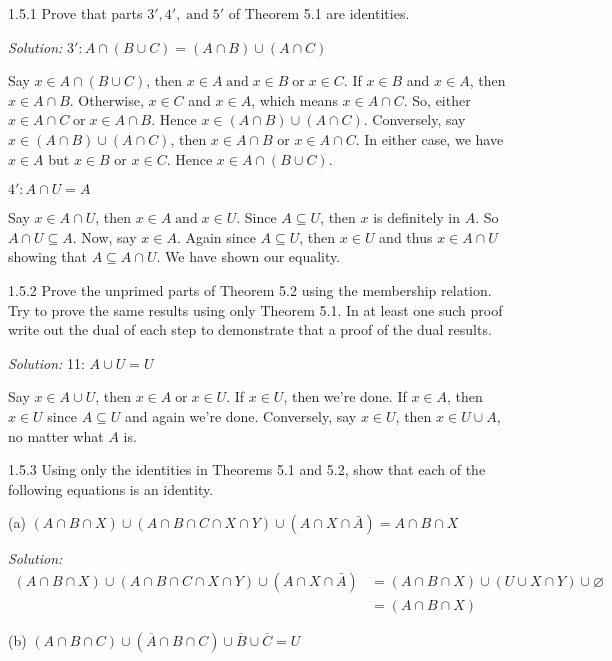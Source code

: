 \documentclass{letter}
\newcommand{\tmop}[1]{\ensuremath{\operatorname{#1}}}
\newcommand{\tmtextit}[1]{{\itshape{#1}}}
\begin{document}
1.5.1 Prove that parts $3', 4', \tmop{and} 5'$ of Theorem 5.1 are identities.

\tmtextit{Solution:} $3' : A \cap (B \cup C) = (A \cap B) \cup (A \cap C)$

Say $x \in A \cap (B \cup C)$, then $x \in A \tmop{and} x \in B \tmop{or} x
\in C$. If $x \in B$ and $x \in A$, then $x \in A \cap B$. Otherwise, $x \in
C$ and $x \in A$, which means $x \in A \cap C$. So, either $x \in A \cap C
\tmop{or} x \in A \cap B$. Hence $x \in (A \cap B) \cup (A \cap C)$.
Conversely, say $x \in (A \cap B) \cup (A \cap C)$, then $x \in A \cap B$ or
$x \in A \cap C$. In either case, we have $x \in A$ but $x \in B$ or $x \in
C$. Hence $x \in A \cap (B \cup C)$.

$4' : A \cap U = A$

Say $x \in A \cap U$, then $x \in A \tmop{and} x \in U$. Since $A \subseteq
U$, then $x$ is definitely in $A$. So $A \cap U \subseteq A$. Now, say $x \in
A$. Again since $A \subseteq U$, then $x \in U$ and thus $x \in A \cap U$
showing that $A \subseteq A \cap U$. We have shown our equality.

1.5.2 Prove the unprimed parts of Theorem 5.2 using the membership relation.
Try to prove the same results using only Theorem 5.1. In at least one such
proof write out the dual of each step to demonstrate that a proof of the dual
results.

\tmtextit{Solution:} 11: $A \cup U = U$

Say $x \in A \cup U$, then $x \in A \tmop{or} x \in U$. If $x \in U$, then
we're done. If $x \in A$, then $x \in U$ since $A \subseteq U$ and again we're
done. Conversely, say $x \in U$, then $x \in U \cup A$, no matter what $A$ is.

1.5.3 Using only the identities in Theorems 5.1 and 5.2, show that each of the
following equations is an identity.

(a) $(A \cap B \cap X) \cup (A \cap B \cap C \cap X \cap Y) \cup (A \cap X
\cap \bar{A}) = A \cap B \cap X$

\tmtextit{Solution:} $\begin{array}{ll}
  (A \cap B \cap X) \cup (A \cap B \cap C \cap X \cap Y) \cup (A \cap X \cap
  \bar{A}) & = \text{$(A \cap B \cap X) \cup (U \cup X \cap Y) \cup
  \varnothing$}\\
  & = (A \cap B \cap X)
\end{array}$

(b) $(A \cap B \cap C) \cup ( \overline{A} \cap B \cap C) \cup \overline{B}
\cup \overline{C} = U$
\end{document}

